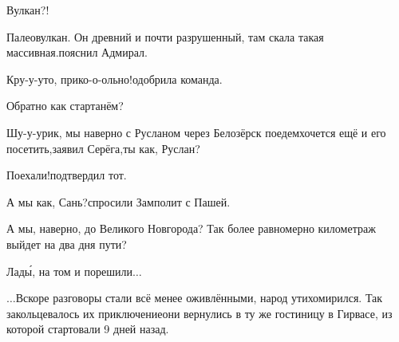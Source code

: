 \diagdash Вулкан?!

\diagdash Палеовулкан. Он древний и почти разрушенный, там скала такая массивная.\mdash пояснил Адмирал.

\diagdash Кру-у-уто, прико-о-ольно!\mdash одобрила команда.

\diagdash Обратно как стартанём?

\diagdash Шу-у-урик, мы наверно с Русланом через Белозёрск поедем\mdash хочется ещё и его посетить,\mdash заявил Серёга,\mdash ты как, Руслан?

\diagdash Поехали!\mdash подтвердил тот.

\diagdash А мы как, Сань?\mdash спросили Замполит с Пашей.

\diagdash А мы, наверно, до Великого Новгорода? Так более равномерно километраж выйдет на два дня пути?

\diagdash Лад\'{ы}, на том и порешили$\ldots$

$\ldots$Вскоре разговоры стали всё менее оживлёнными, народ утихомирился. Так закольцевалось их приключение\mdash они вернулись в ту же гостиницу в Гирвасе, из которой стартовали 9 дней назад.

\begin{center}
\end{center}
